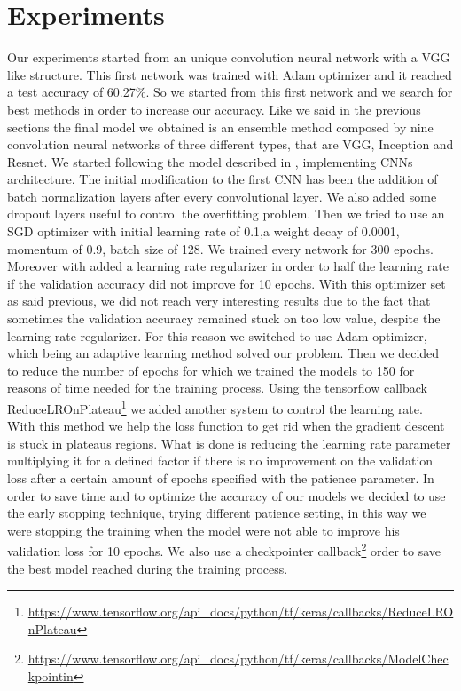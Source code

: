 \documentclass[10pt,twocolumn,letterpaper]{article}
\begin{document}
\section{Experiments}
Our experiments started from an unique convolution neural network with a VGG like structure.
This first network was trained with Adam optimizer and it reached a test accuracy of 60.27\%.
So we started from this first network and we search for best methods in order to increase our accuracy.
Like we said in the previous sections the final model we obtained is an ensemble method composed by nine convolution neural networks
of three different types, that are VGG, Inception and Resnet.
We started following the model described in \cite{147}, implementing CNNs architecture.
The initial modification to the first CNN has been the addition of batch normalization layers after every convolutional layer.
We also added some dropout layers useful to control the overfitting problem.
Then we tried to use an SGD optimizer with initial learning rate of 0.1,a weight decay of 0.0001, momentum of 0.9, batch size of 128.
We trained every network for 300 epochs.
Moreover with added a learning rate regularizer in order to half the learning rate if the validation accuracy did not improve for 10 epochs.
With this optimizer set as said previous, we did not reach very interesting results due to the fact that sometimes the validation accuracy
remained stuck on too low value, despite the learning rate regularizer.
For this reason we switched to use Adam optimizer, which being an adaptive learning method solved our problem.
Then we decided to reduce the number of epochs for which we trained the models to 150 for
reasons of time needed for the training process.
Using the tensorflow callback ReduceLROnPlateau\footnote{\url{https://www.tensorflow.org/api_docs/python/tf/keras/callbacks/ReduceLROnPlateau}} 
we added another system to control the learning rate. With this method we help the loss function to get rid when the gradient descent is stuck in plateaus regions.
What is done is reducing the learning rate parameter multiplying it for a defined factor if there is no improvement on the validation loss after a certain amount of epochs specified with the patience parameter.
In order to save time and to optimize the accuracy of our models we decided to use the early stopping technique, trying different patience setting,
in this way we were stopping the training when the model were not able to improve his validation loss for 10 epochs.
We also use a checkpointer callback\footnote{\url{https://www.tensorflow.org/api_docs/python/tf/keras/callbacks/ModelCheckpointin}} order to save the best model reached during the training process.
\end{document}
